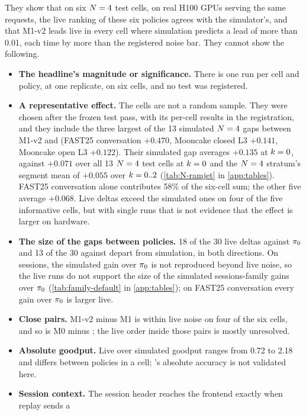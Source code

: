 They show that on six $N = 4$ test cells, on real H100 GPUs serving the same requests, the live
ranking of these six policies agrees with the simulator's, and that M1-v2 leads  live
in every cell where simulation predicts a lead of more than 0.01, each time by more than the
registered noise bar. They cannot show the following.
\begin{itemize}
  \item \textbf{The headline's magnitude or significance.} There is one run per cell and policy, at one
    replicate, on six cells, and no test was registered.
  \item \textbf{A representative effect.} The cells are not a random sample. They were chosen after the
    frozen test pass, with its per-cell results in the registration, and they include the three
    largest of the 13 simulated $N = 4$ gaps between M1-v2 and  (FAST25 conversation
    $+0.470$, Mooncake closed L3 $+0.141$, Mooncake open L3 $+0.122$). Their simulated gap averages
    $+0.135$ at $k = 0$, against $+0.071$ over all 13 $N = 4$ test cells at $k = 0$ and the
    $N = 4$ stratum's segment mean of $+0.055$ over $k = 0..2$ (\cref{tab:N-ramjet} in
    \cref{app:tables}). FAST25
    conversation alone contributes 58\% of the six-cell sum; the other five average $+0.068$. Live
    deltas exceed the simulated ones on four of the five informative cells, but with single runs that
    is not evidence that the effect is larger on hardware.
  \item \textbf{The size of the gaps between policies.} 18 of the 30 live deltas against $\pi_{0}$ and
    13 of the 30 against  depart from simulation, in both directions. On sessions, the
    simulated gain over $\pi_{0}$ is not reproduced beyond live noise, so the live runs do not support
    the size of the simulated sessions-family gains over $\pi_{0}$ (\cref{tab:family-default} in
    \cref{app:tables}); on
    FAST25 conversation every gain over $\pi_{0}$ is larger live.
  \item \textbf{Close pairs.} M1-v2 minus M1 is within live noise on four of the six cells, and so is
    M0 minus ; the live order inside those pairs is mostly unresolved.
  \item \textbf{Absolute goodput.} Live over simulated goodput ranges from 0.72 to 2.18 and differs
    between policies in a cell; \ais{}'s absolute accuracy is not validated here.
  \item \textbf{Session context.} The session header reaches the frontend exactly when replay sends a

\end{itemize}
